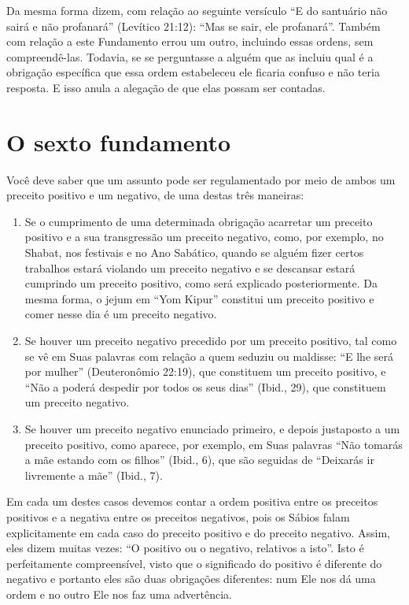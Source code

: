 Da mesma forma dizem, com relação ao seguinte versículo ``E do
santuário não sairá e não profanará'' (Levítico 21:12): ``Mas se sair,
ele profanará''.
Também com relação a este Fundamento errou um outro, incluindo essas
ordens, sem compreendê-las. Todavia, se se perguntasse a alguém que as
incluiu qual é a obrigação específica que essa ordem estabeleceu ele
ficaria confuso e não teria resposta. E isso anula a alegação de que
elas possam ser contadas.

\chapter*{O sexto fundamento}

Você deve saber que um assunto pode ser regulamentado por meio de ambos
um preceito positivo e um negativo, de uma destas três maneiras:

\begin{enumerate}
\def\labelenumi{\arabic{enumi}.}
\item
  Se o cumprimento de uma determinada obrigação acarretar um preceito
  positivo e a sua transgressão um preceito negativo, como, por
  exemplo, no Shabat, nos festivais e no Ano Sabático, quando se alguém
  fizer certos trabalhos estará violando um preceito negativo e se
  descansar estará cumprindo um preceito positivo, como será explicado
  posteriormente. Da mesma forma, o jejum em ``Yom Kipur'' constitui um
  preceito positivo e comer nesse dia é um preceito negativo.

\item
  Se houver um preceito negativo precedido por um preceito positivo,
  tal como se vê em Suas palavras com relação a quem seduziu ou
  maldisse: ``E lhe será por mulher'' (Deuteronômio 22:19), que
  constituem um preceito positivo, e ``Não a poderá despedir por todos
  os seus dias'' (Ibid., 29), que constituem um preceito negativo.

\item
  Se houver um preceito negativo enunciado primeiro, e depois
  justaposto a um preceito positivo, como aparece, por exemplo, em Suas
  palavras ``Não tomarás a mãe estando com os filhos'' (Ibid., 6), que
  são seguidas de ``Deixarás ir livremente a mãe'' (Ibid., 7).
\end{enumerate}

Em cada um destes casos devemos contar a ordem positiva entre os
preceitos positivos e a negativa entre os preceitos negativos, pois os
Sábios falam explicitamente em cada caso do preceito positivo e do preceito
negativo. Assim, eles dizem muitas vezes: ``O positivo ou o negativo,
relativos a isto''. Isto é perfeitamente compreensível, visto que o
significado do positivo é diferente do negativo e portanto eles são
duas obrigações diferentes: num Ele nos dá uma ordem e no outro Ele nos
faz uma advertência.

